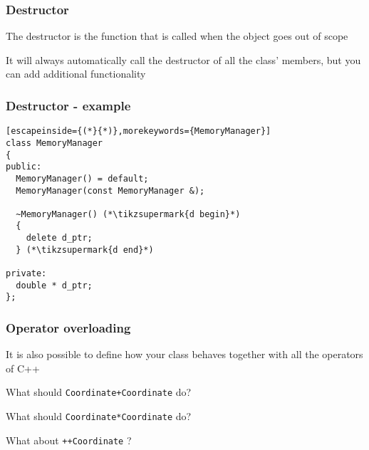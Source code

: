 \documentclass[14pt,a4paper,dvipsnames,usenames]{beamer}
\begin{document}
\begin{frame}
  \frametitle{Destructor}

  The destructor is the function that is called when the object goes out of scope

  \vspace{.5em}
  It will always automatically call the destructor of all the class' members,
  but you can add additional functionality
  
\end{frame}

\begin{frame}[fragile]
  \frametitle{Destructor - example}

  
  \begin{lstlisting}[escapeinside={(*}{*)},morekeywords={MemoryManager}]
class MemoryManager
{
public:
  MemoryManager() = default;
  MemoryManager(const MemoryManager &);

  ~MemoryManager() (*\tikzsupermark{d begin}*)
  {
    delete d_ptr;
  } (*\tikzsupermark{d end}*)

private:
  double * d_ptr;
};
  \end{lstlisting}

\end{frame}

\begin{frame}
  \frametitle{Operator overloading}

  It is also possible to define how your class behaves together with all the operators of C++

  \vspace{1em}
  What should \lstinline[morekeywords={Coordinate}]!Coordinate+Coordinate! do?

  \vspace{1em}
  What should \lstinline[morekeywords={Coordinate}]!Coordinate*Coordinate! do?

  \vspace{1em}
  What about \lstinline[morekeywords={Coordinate}]!++Coordinate! ?
  
\end{frame}
\end{document}
